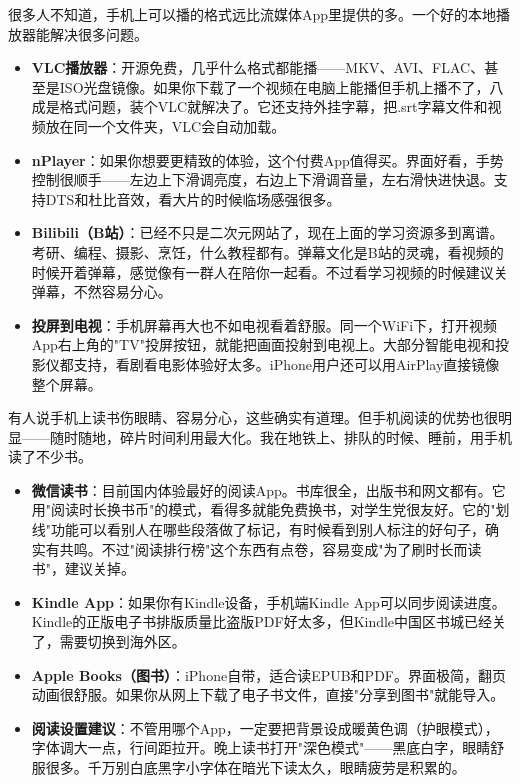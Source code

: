 
很多人不知道，手机上可以播的格式远比流媒体App里提供的多。一个好的本地播放器能解决很多问题。

\begin{itemize}
  \item \textbf{VLC播放器}：开源免费，几乎什么格式都能播——MKV、AVI、FLAC、甚至是ISO光盘镜像。如果你下载了一个视频在电脑上能播但手机上播不了，八成是格式问题，装个VLC就解决了。它还支持外挂字幕，把.srt字幕文件和视频放在同一个文件夹，VLC会自动加载。
  \item \textbf{nPlayer}：如果你想要更精致的体验，这个付费App值得买。界面好看，手势控制很顺手——左边上下滑调亮度，右边上下滑调音量，左右滑快进快退。支持DTS和杜比音效，看大片的时候临场感强很多。
  \item \textbf{Bilibili（B站）}：已经不只是二次元网站了，现在上面的学习资源多到离谱。考研、编程、摄影、烹饪，什么教程都有。弹幕文化是B站的灵魂，看视频的时候开着弹幕，感觉像有一群人在陪你一起看。不过看学习视频的时候建议关弹幕，不然容易分心。
  \item \textbf{投屏到电视}：手机屏幕再大也不如电视看着舒服。同一个WiFi下，打开视频App右上角的"TV"投屏按钮，就能把画面投射到电视上。大部分智能电视和投影仪都支持，看剧看电影体验好太多。iPhone用户还可以用AirPlay直接镜像整个屏幕。
\end{itemize}


有人说手机上读书伤眼睛、容易分心，这些确实有道理。但手机阅读的优势也很明显——随时随地，碎片时间利用最大化。我在地铁上、排队的时候、睡前，用手机读了不少书。

\begin{itemize}
  \item \textbf{微信读书}：目前国内体验最好的阅读App。书库很全，出版书和网文都有。它用"阅读时长换书币"的模式，看得多就能免费换书，对学生党很友好。它的"划线"功能可以看别人在哪些段落做了标记，有时候看到别人标注的好句子，确实有共鸣。不过"阅读排行榜"这个东西有点卷，容易变成"为了刷时长而读书"，建议关掉。
  \item \textbf{Kindle App}：如果你有Kindle设备，手机端Kindle App可以同步阅读进度。Kindle的正版电子书排版质量比盗版PDF好太多，但Kindle中国区书城已经关了，需要切换到海外区。
  \item \textbf{Apple Books（图书）}：iPhone自带，适合读EPUB和PDF。界面极简，翻页动画很舒服。如果你从网上下载了电子书文件，直接"分享到图书"就能导入。
  \item \textbf{阅读设置建议}：不管用哪个App，一定要把背景设成暖黄色调（护眼模式），字体调大一点，行间距拉开。晚上读书打开"深色模式"——黑底白字，眼睛舒服很多。千万别白底黑字小字体在暗光下读太久，眼睛疲劳是积累的。
\end{itemize}


